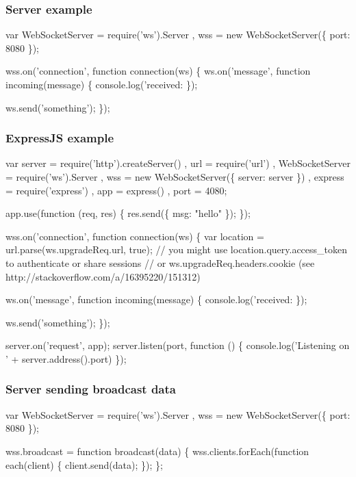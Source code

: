 \subsubsection*{Server example}


\begin{DoxyCode}
var WebSocketServer = require('ws').Server
  , wss = new WebSocketServer(\{ port: 8080 \});

wss.on('connection', function connection(ws) \{
  ws.on('message', function incoming(message) \{
    console.log('received: %
  \});

  ws.send('something');
\});
\end{DoxyCode}


\subsubsection*{Express\+JS example}


\begin{DoxyCode}
var server = require('http').createServer()
  , url = require('url')
  , WebSocketServer = require('ws').Server
  , wss = new WebSocketServer(\{ server: server \})
  , express = require('express')
  , app = express()
  , port = 4080;

app.use(function (req, res) \{
  res.send(\{ msg: "hello" \});
\});

wss.on('connection', function connection(ws) \{
  var location = url.parse(ws.upgradeReq.url, true);
  // you might use location.query.access\_token to authenticate or share sessions
  // or ws.upgradeReq.headers.cookie (see http://stackoverflow.com/a/16395220/151312)

  ws.on('message', function incoming(message) \{
    console.log('received: %
  \});

  ws.send('something');
\});

server.on('request', app);
server.listen(port, function () \{ console.log('Listening on ' + server.address().port) \});
\end{DoxyCode}


\subsubsection*{Server sending broadcast data}


\begin{DoxyCode}
var WebSocketServer = require('ws').Server
  , wss = new WebSocketServer(\{ port: 8080 \});

wss.broadcast = function broadcast(data) \{
  wss.clients.forEach(function each(client) \{
    client.send(data);
  \});
\};
\end{DoxyCode}


